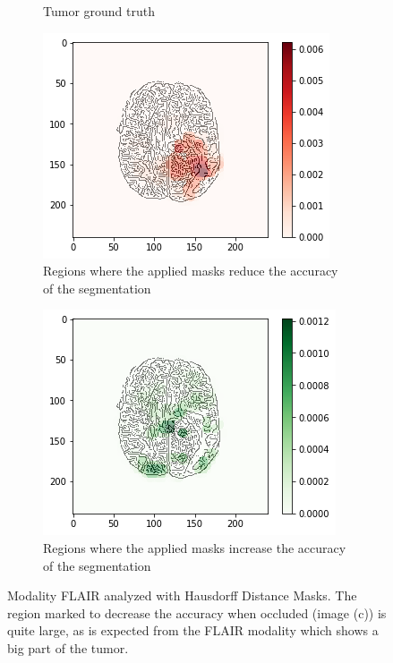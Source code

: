 \begin{figure}[H]
\begin{subfigure}[t]{.4\textwidth}
        \caption{Tumor ground truth}
    \end{subfigure}
    \begin{subfigure}[t]{.45\textwidth}
        \centering
        \includegraphics[width=\linewidth]{chapters/06_hdm/b_Brats18_TCIA08_242_1_L2/38.png}
        \caption{Regions where the applied masks reduce the accuracy of the segmentation}
    \end{subfigure}\hspace{1cm}%
    \begin{subfigure}[t]{.45\textwidth}
        \centering
        \includegraphics[width=\linewidth]{chapters/06_hdm/b_Brats18_TCIA08_242_1_L2/39.png}
        \caption{Regions where the applied masks increase the accuracy of the segmentation}
    \end{subfigure}
    \caption{Modality FLAIR analyzed with Hausdorff Distance Masks. The region marked to decrease the accuracy when occluded (image (c)) is quite large, as is expected from the FLAIR modality which shows a big part of the tumor.}
    \label{brats_tcia08_flair}
\end{figure}

